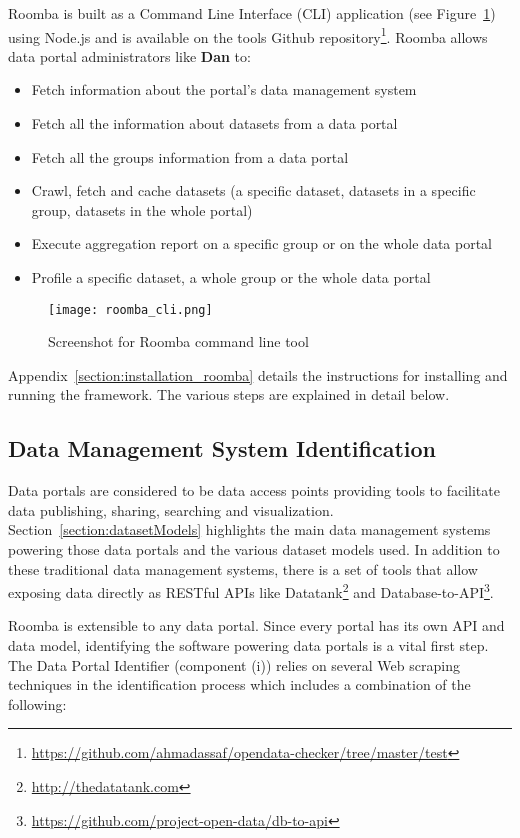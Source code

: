 Roomba is built as a Command Line Interface (CLI) application (see Figure~\ref{fig:roomba_cli}) using Node.js and is available on the tools Github repository\footnote{\url{https://github.com/ahmadassaf/opendata-checker/tree/master/test}}. Roomba allows data portal administrators like \textbf{Dan} to:

\begin{itemize}
  \item Fetch information about the portal's data management system
	\item Fetch all the information about datasets from a data portal
	\item Fetch all the groups information from a data portal
	\item Crawl, fetch and cache datasets (a specific dataset, datasets in a specific group, 	datasets in the whole portal)
	\item Execute aggregation report on a specific group or on the whole data portal
	\item Profile a specific dataset, a whole group or the whole data portal
\end{itemize}

\begin{figure}[hb]
  \centering
  \texttt{[image: roomba\_cli.png]}
  \caption{Screenshot for Roomba command line tool}
  \label{fig:roomba_cli}
\end{figure}

Appendix~\ref{section:installation_roomba} details the instructions for installing and running the framework. The various steps are explained in detail below.

\subsection{Data Management System Identification}
Data portals are considered to be data access points providing tools to facilitate data publishing, sharing, searching and visualization. Section~\ref{section:datasetModels} highlights the main data management systems powering those data portals and the various dataset models used. In addition to these traditional data management systems, there is a set of tools that allow exposing data directly as RESTful APIs like Datatank\footnote{\url{http://thedatatank.com}} and Database-to-API\footnote{\url{https://github.com/project-open-data/db-to-api}}.

Roomba is extensible to any data portal. Since every portal has its own API and data model, identifying the software powering data portals is a vital first step. The Data Portal Identifier (component (i)) relies on several Web scraping techniques in the identification process which includes a combination of the following:

